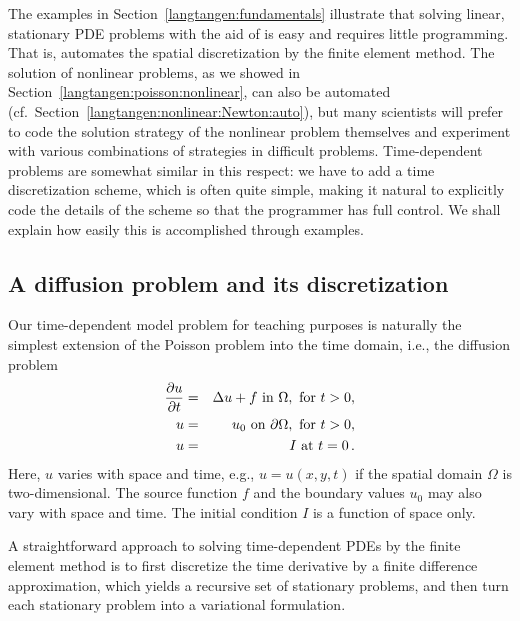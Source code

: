 The examples in Section~\ref{langtangen:fundamentals}
illustrate that solving linear, stationary PDE problems
with the aid of \fenics{} is easy and requires little programming.
That is, \fenics{} automates the spatial discretization by the
finite element method. 
The solution of nonlinear problems, as we showed in Section~\ref{langtangen:poisson:nonlinear}, can also be automated (cf.~Section~\ref{langtangen:nonlinear:Newton:auto}),
but many scientists will prefer to code the solution strategy of the
nonlinear problem themselves and experiment with various combinations of
strategies in
difficult problems. Time-dependent problems are somewhat similar in
this respect: we have to add a time discretization scheme, which
is often quite simple, making it natural to explicitly code the
details of the scheme so that the programmer has full control.
We shall explain how easily this is accomplished through examples.

\subsection{A diffusion problem and its discretization}
\label{langtangen:timedep:diffusion1}

Our time-dependent
model problem for teaching purposes is naturally the simplest
extension of the Poisson problem into the time domain, i.e., 
the diffusion problem
\begin{eqnarray}
{\partial u\over\partial t} &=& \Delta u + f \mbox{ in } \Omega, \hbox{ for } t>0,
\label{langtangen:diffusion:pde1}\\
    u &=& u_0 \mbox{ on } \partial \Omega,\hbox{ for } t>0,
\label{langtangen:diffusion:pde1:bc}\\
    u &=& I   \mbox{ at } t=0\thinspace .
\label{langtangen:diffusion:pde1:ic}
\end{eqnarray}
Here, $u$ varies with space and time, e.g., $u=u(x,y,t)$ if the spatial
domain $\Omega$ is two-dimensional. The source function $f$ and the
boundary values $u_0$ may also vary with space and time.
The initial condition $I$ is a function of space only.

A straightforward approach to solving time-dependent
PDEs by the finite element method is to first discretize the
time derivative by a finite difference approximation, which yields
a recursive set of stationary problems, and then turn each stationary
problem into a variational formulation.

